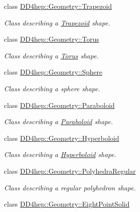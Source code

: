 \begin{DoxyCompactItemize}
class \hyperlink{class_d_d4hep_1_1_geometry_1_1_trapezoid}{DD4hep::Geometry::Trapezoid}
\begin{DoxyCompactList}\small\item\em Class describing a \hyperlink{class_d_d4hep_1_1_geometry_1_1_trapezoid}{Trapezoid} shape. \item\end{DoxyCompactList}\item 
class \hyperlink{class_d_d4hep_1_1_geometry_1_1_torus}{DD4hep::Geometry::Torus}
\begin{DoxyCompactList}\small\item\em Class describing a \hyperlink{class_d_d4hep_1_1_geometry_1_1_torus}{Torus} shape. \item\end{DoxyCompactList}\item 
class \hyperlink{class_d_d4hep_1_1_geometry_1_1_sphere}{DD4hep::Geometry::Sphere}
\begin{DoxyCompactList}\small\item\em Class describing a sphere shape. \item\end{DoxyCompactList}\item 
class \hyperlink{class_d_d4hep_1_1_geometry_1_1_paraboloid}{DD4hep::Geometry::Paraboloid}
\begin{DoxyCompactList}\small\item\em Class describing a \hyperlink{class_d_d4hep_1_1_geometry_1_1_paraboloid}{Paraboloid} shape. \item\end{DoxyCompactList}\item 
class \hyperlink{class_d_d4hep_1_1_geometry_1_1_hyperboloid}{DD4hep::Geometry::Hyperboloid}
\begin{DoxyCompactList}\small\item\em Class describing a \hyperlink{class_d_d4hep_1_1_geometry_1_1_hyperboloid}{Hyperboloid} shape. \item\end{DoxyCompactList}\item 
class \hyperlink{class_d_d4hep_1_1_geometry_1_1_polyhedra_regular}{DD4hep::Geometry::PolyhedraRegular}
\begin{DoxyCompactList}\small\item\em Class describing a regular polyhedron shape. \item\end{DoxyCompactList}\item 
class \hyperlink{class_d_d4hep_1_1_geometry_1_1_eight_point_solid}{DD4hep::Geometry::EightPointSolid}

\end{DoxyCompactItemize}
